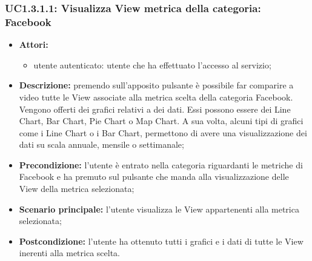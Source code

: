 \subsubsection{UC1.3.1.1: Visualizza View metrica della categoria: Facebook}
\begin{itemize}
	\item \textbf{Attori:}
	\begin{itemize}
		\item utente autenticato: utente che ha effettuato l'accesso al servizio;
	\end{itemize}
	\item \textbf{Descrizione:} premendo sull'apposito pulsante è possibile far comparire a video tutte le View associate alla metrica scelta della categoria Facebook. Vengono offerti dei grafici relativi a dei dati. Essi possono essere dei Line Chart, Bar Chart, Pie Chart o Map Chart. A sua volta, alcuni tipi di grafici come i Line Chart o i Bar Chart, permettono di avere una visualizzazione dei dati su scala annuale, mensile o settimanale;
	\item \textbf{Precondizione:} l'utente è entrato nella categoria riguardanti le metriche di Facebook e ha premuto sul pulsante che manda alla visualizzazione delle View della metrica selezionata;
	\item \textbf{Scenario principale:} l'utente visualizza le View appartenenti alla metrica selezionata;
	\item \textbf{Postcondizione:} l'utente ha ottenuto tutti i grafici e i dati di tutte le View inerenti alla metrica scelta.
\end{itemize}

